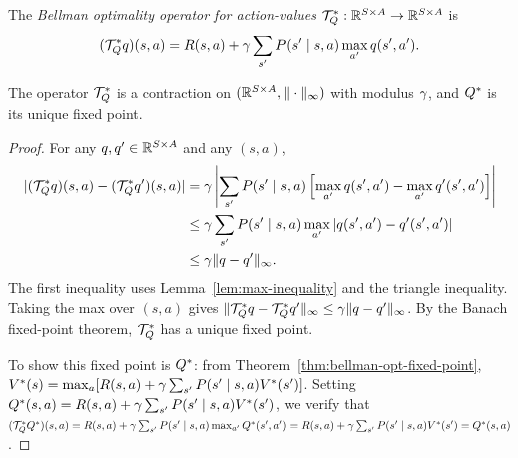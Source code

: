\documentclass[11pt,a4paper]{article}
\begin{document}
\begin{definition}
\label{def:bellman-q-op}
The \emph{Bellman optimality operator for action-values}
$\mathcal{T}^*_Q : \mathbb{R}^{S \times A} \to \mathbb{R}^{S \times A}$ is
\[
    (\mathcal{T}^*_Q q)(s,a) = R(s,a) + \gamma \sum_{s'}
    P(s' \mid s,a) \max_{a'} q(s', a').
\]
\end{definition}

\begin{proposition}
\label{prop:bellman-q-contraction}
The operator $\mathcal{T}^*_Q$ is a contraction on
$(\mathbb{R}^{S \times A}, \|\cdot\|_\infty)$ with modulus $\gamma$, and
$Q^*$ is its unique fixed point.
\end{proposition}

\begin{proof}
For any $q, q' \in \mathbb{R}^{S \times A}$ and any $(s,a)$,
\begin{align*}
    |(\mathcal{T}^*_Q q)(s,a) - (\mathcal{T}^*_Q q')(s,a)|
    &= \gamma \left| \sum_{s'} P(s' \mid s,a)
       \left[\max_{a'} q(s',a') - \max_{a'} q'(s',a')\right]
       \right| \\
    &\leq \gamma \sum_{s'} P(s' \mid s,a)
       \max_{a'} |q(s',a') - q'(s',a')| \\
    &\leq \gamma \|q - q'\|_\infty.
\end{align*}
The first inequality uses Lemma~\ref{lem:max-inequality} and the
triangle inequality. Taking the max over $(s,a)$ gives
$\|\mathcal{T}^*_Q q - \mathcal{T}^*_Q q'\|_\infty \leq \gamma
\|q - q'\|_\infty$. By the Banach fixed-point theorem, $\mathcal{T}^*_Q$
has a unique fixed point.

To show this fixed point is $Q^*$: from
Theorem~\ref{thm:bellman-opt-fixed-point},
$V^*(s) = \max_a [R(s,a) + \gamma \sum_{s'} P(s' \mid s,a)
V^*(s')]$. Setting $Q^*(s,a) = R(s,a) + \gamma \sum_{s'}
P(s' \mid s,a) V^*(s')$, we verify that
$(\mathcal{T}^*_Q Q^*)(s,a) = R(s,a) + \gamma \sum_{s'}
P(s' \mid s,a) \max_{a'} Q^*(s',a') = R(s,a) + \gamma
\sum_{s'} P(s' \mid s,a) V^*(s') = Q^*(s,a)$.
\end{proof}
\end{document}
